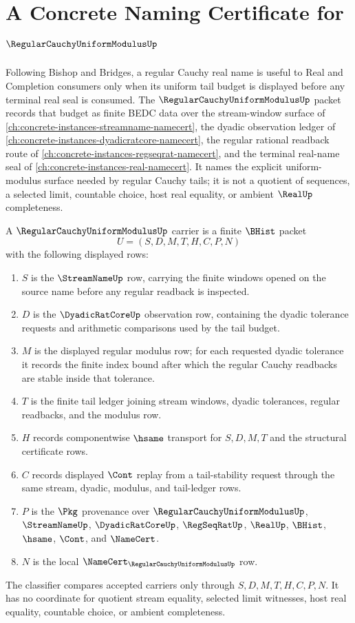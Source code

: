 \chapter{A Concrete Naming Certificate for $\RegularCauchyUniformModulusUp$}
\label{ch:concrete-instances-regular-cauchy-uniform-modulus-namecert}

Following Bishop and Bridges, a regular Cauchy real name is useful to Real and Completion consumers only when its uniform tail budget is displayed before any terminal real seal is consumed. The $\RegularCauchyUniformModulusUp$ packet records that budget as finite BEDC data over the stream-window surface of \autoref{ch:concrete-instances-streamname-namecert}, the dyadic observation ledger of \autoref{ch:concrete-instances-dyadicratcore-namecert}, the regular rational readback route of \autoref{ch:concrete-instances-regseqrat-namecert}, and the terminal real-name seal of \autoref{ch:concrete-instances-real-namecert}. It names the explicit uniform-modulus surface needed by regular Cauchy tails; it is not a quotient of sequences, a selected limit, countable choice, host real equality, or ambient $\RealUp$ completeness.

\begin{definition}
\label{def:regular-cauchy-uniform-modulus-carrier}
A $\RegularCauchyUniformModulusUp$ carrier is a finite $\BHist$ packet
$$
U=(S,D,M,T,H,C,P,N)
$$
with the following displayed rows:
\begin{enumerate}
\item $S$ is the $\StreamNameUp$ row, carrying the finite windows opened on the source name before any regular readback is inspected.
\item $D$ is the $\DyadicRatCoreUp$ observation row, containing the dyadic tolerance requests and arithmetic comparisons used by the tail budget.
\item $M$ is the displayed regular modulus row; for each requested dyadic tolerance it records the finite index bound after which the regular Cauchy readbacks are stable inside that tolerance.
\item $T$ is the finite tail ledger joining stream windows, dyadic tolerances, regular readbacks, and the modulus row.
\item $H$ records componentwise $\hsame$ transport for $S,D,M,T$ and the structural certificate rows.
\item $C$ records displayed $\Cont$ replay from a tail-stability request through the same stream, dyadic, modulus, and tail-ledger rows.
\item $P$ is the $\Pkg$ provenance over $\RegularCauchyUniformModulusUp$, $\StreamNameUp$, $\DyadicRatCoreUp$, $\RegSeqRatUp$, $\RealUp$, $\BHist$, $\hsame$, $\Cont$, and $\NameCert$.
\item $N$ is the local $\NameCert_{\RegularCauchyUniformModulusUp}$ row.
\end{enumerate}
The classifier compares accepted carriers only through $S,D,M,T,H,C,P,N$. It has no coordinate for quotient stream equality, selected limit witnesses, host real equality, countable choice, or ambient completeness.
\end{definition}

